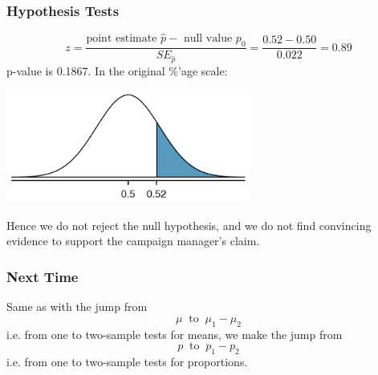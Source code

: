 \documentclass[slides]{beamer}
\newcommand{\blue}[1]{\textcolor{blue2}{#1}}
\newcommand{\phat}{\widehat{p}}
\begin{document}
\begin{frame}[fragile]
\frametitle{Hypothesis Tests}

%
%
\[
z = \frac{\mbox{point estimate }\phat - \mbox{ null value }p_0}{SE_{\phat}} = \frac{0.52 - 0.50}{0.022} = 0.89
\]
\pause p-value is 0.1867.  In the original \%'age scale:
\begin{center}
   \includegraphics[width=0.6\textwidth]{figure/pvalue.png} 
\end{center}
\pause Hence we do \blue{not} reject the null hypothesis, and we do not find convincing evidence to support the campaign manager's claim.  

\end{frame}


\begin{frame}[fragile]
\frametitle{Next Time}

Same as with the jump from 
\[\mu \ \mbox{ to } \ \mu_1-\mu_2\] 
i.e. from one to two-sample tests for means, 
we make the jump from 
\[p \ \mbox{ to } \ p_1-p_2\]
i.e. from one to two-sample tests for proportions.
\end{frame}
\end{document}
